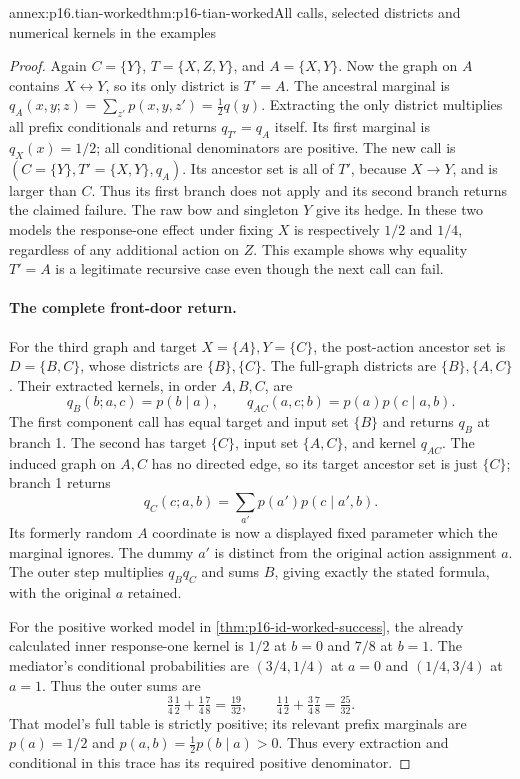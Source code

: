 \begin{annexitem}{annex:p16.tian-worked}{thm:p16-tian-worked}{All calls, selected districts and numerical kernels in the examples}
\begin{proof}
Again \(C=\{Y\}\), \(T=\{X,Z,Y\}\), and
\(A=\{X,Y\}\). Now the graph on \(A\) contains
\(X\leftrightarrow Y\), so its only district is \(T'=A\).
The ancestral marginal is
\(q_A(x,y;z)=\sum_{z'}p(x,y,z')=\frac12q(y)\).
Extracting the only district multiplies all prefix conditionals
and returns \(q_{T'}=q_A\) itself. Its first marginal is
\(q_X(x)=1/2\); all conditional denominators are positive.
The new call is \((C=\{Y\},T'=\{X,Y\},q_A)\).
Its ancestor set is all of \(T'\), because \(X\to Y\),
and is larger than \(C\). Thus its first branch does not apply
and its second branch returns the claimed failure. The raw bow
and singleton \(Y\) give its hedge. In these two models the
response-one effect under fixing \(X\) is respectively \(1/2\)
and \(1/4\), regardless of any additional action on \(Z\).
This example shows why equality \(T'=A\) is a legitimate
recursive case even though the next call can fail.

\paragraph{The complete front-door return.}
For the third graph and target \(X=\{A\},Y=\{C\}\),
the post-action ancestor set is \(D=\{B,C\}\), whose districts
are \(\{B\},\{C\}\). The full-graph districts are
\(\{B\},\{A,C\}\). Their extracted kernels, in order
\(A,B,C\), are
\[
 q_B(b;a,c)=p(b\mid a),\qquad
 q_{AC}(a,c;b)=p(a)p(c\mid a,b).
\]
The first component call has equal target and input set \(\{B\}\)
and returns \(q_B\) at branch 1. The second has target
\(\{C\}\), input set \(\{A,C\}\), and kernel \(q_{AC}\).
The induced graph on \(A,C\) has no directed edge, so its
target ancestor set is just \(\{C\}\); branch 1 returns
\[
 q_C(c;a,b)=\sum_{a'}p(a')p(c\mid a',b).
\]
Its formerly random \(A\) coordinate is now a displayed fixed
parameter which the marginal ignores. The dummy \(a'\) is
distinct from the original action assignment \(a\). The outer
step multiplies \(q_B q_C\) and sums \(B\), giving exactly
the stated formula, with the original \(a\) retained.

For the positive worked model in \cref{thm:p16-id-worked-success},
the already calculated inner response-one kernel is \(1/2\)
at \(b=0\) and \(7/8\) at \(b=1\). The mediator's
conditional probabilities are \((3/4,1/4)\) at \(a=0\)
and \((1/4,3/4)\) at \(a=1\). Thus the outer sums are
\[
 \tfrac34\tfrac12+\tfrac14\tfrac78=\tfrac{19}{32},\qquad
 \tfrac14\tfrac12+\tfrac34\tfrac78=\tfrac{25}{32}.
\]
That model's full table is strictly positive; its relevant prefix
marginals are \(p(a)=1/2\) and
\(p(a,b)=\frac12p(b\mid a)>0\). Thus every extraction and
conditional in this trace has its required positive denominator.


\end{proof}
\end{annexitem}
